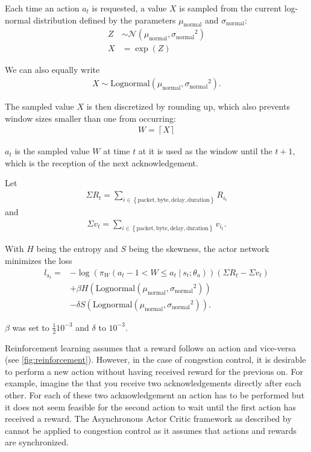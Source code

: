 \documentclass[sigconf]{acmart}
\newcommand\givenbase[1][]{\:#1\lvert\:}
\let\given\givenbase
\begin{document}
Each time an action $a_t$ is requested, a value $X$ is sampled from the current log-normal distribution defined by the parameters $\mu_\text{normal}$ and $\sigma_\text{normal}$: 
\begin{align*}
Z&\sim {\mathcal {N}}(\mu_\text{normal} ,{\sigma_{\text{normal}}}^{2})\\
X&=\exp(Z)
\end{align*}

We can also equally write
\begin{align*}
X \sim \text{Lognormal}\left( \mu_\text{normal}, {\sigma_{\text{normal}}}^{2}\right).
\end{align*}

The sampled value $X$ is then discretized by rounding up, which also prevents window sizes smaller than one from occurring:
\begin{align*}
W = \left\lceil X \right\rceil
\end{align*}

$a_t$ is the sampled value $W$ at time $t$ at it is used as the window until the $t+1$, which is the reception of the next acknowledgement. 

Let
\begin{align*}
\Sigma R_t = \sum_{i \in \left \{\text{packet}, \text{byte}, \text{delay}, \text{duration}\right \}} R_{i_t}
\end{align*}
and
\begin{align*}
\Sigma v_t = \sum_{i \in \left \{\text{packet}, \text{byte}, \text{delay}, \text{duration}\right \}} v_{i_t}.
\end{align*}

With $H$ being the entropy and $S$ being the skewness, the actor network minimizes the loss
\begin{align*}
l_{\text{a}_t} =& -\log \left( \pi_W\left( a_t-1 < W \leq a_t \given s_t; \theta_a \right)\right)\left(\Sigma R_t - \Sigma v_t\right)\\ 
&+ \beta H\left(\text{Lognormal}\left( \mu_\text{normal}, {\sigma_{\text{normal}}}^{2}\right) \right)\\
&- \delta S\left(\text{Lognormal}\left( \mu_\text{normal}, {\sigma_{\text{normal}}}^{2}\right) \right).
\end{align*}

$\beta$ was set to $\frac 1 2 10^{-3}$ and $\delta$ to $10^{-3}$.

Reinforcement learning assumes that a reward follows an action and vice-versa (see \autoref{fig:reinforcement}). However, in the case of congestion control, it is desirable to perform a new action without having received reward for the previous on. For example, imagine the that you receive two acknowledgements directly after each other. For each of these two acknowledgement an action has to be performed but it does not seem feasible for the second action to wait until the first action has received a reward. The Asynchronous Actor Critic framework as described by \cite{mnih_asynchronous_2016} cannot be applied to congestion control as it assumes that actions and rewards are synchronized. 
\end{document}
